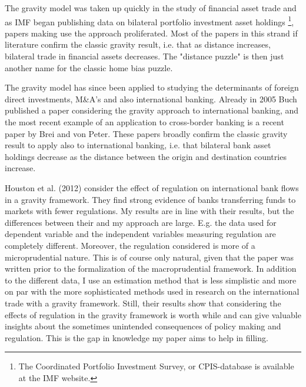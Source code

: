 \documentclass[12pt,a4paper]{article}
\begin{document}
The gravity model was taken up quickly in the study of financial asset trade and as IMF began publishing data on bilateral portfolio investment asset holdings \footnote{The Coordinated Portfolio Investment Survey, or CPIS-database is available at the IMF website.}, papers making use the approach proliferated. Most of the papers in this strand if literature confirm the classic gravity result, i.e. that as distance increases, bilateral trade in financial assets decreases. The "distance puzzle" is then just another name for the classic home bias puzzle.

The gravity model has since been applied to studying the determinants of foreign direct investments, M\&A's and also international banking. Already in 2005 Buch published a paper considering the gravity approach to international banking, and the most recent example of an application to cross-border banking is a recent paper by Brei and von Peter. These papers broadly confirm the classic gravity result to apply also to international banking, i.e. that bilateral bank asset holdings decrease as the distance between the origin and destination countries increase. 

Houston et al. (2012) consider the effect of regulation on international bank flows in a gravity framework. They find strong evidence of banks transferring funds to markets with fewer regulations. My results are in line with their results, but the differences between their and my approach are large. E.g. the data used for dependent variable and the independent variables measuring regulation are completely different. Moreover, the regulation considered is more of a microprudential nature. This is of course only natural, given that the paper was written prior to the formalization of the macroprudential framework. In addition to the different data, I use an estimation method that is less simplistic and more on par with the more sophisticated methods used in research on the international trade with a gravity framework. Still, their results show that considering the effects of regulation in the gravity framework is worth while and can give valuable insights about the sometimes unintended consequences of policy making and regulation. This is the gap in knowledge my paper aims to help in filling. 
\end{document}
